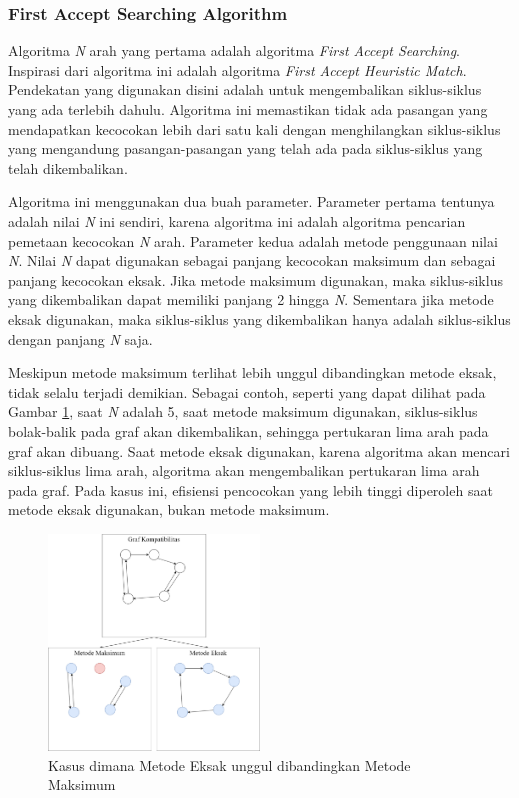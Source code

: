 \documentclass[conference]{IEEEtran}
\begin{document}
\subsubsection{First Accept Searching Algorithm}
Algoritma \textit{N} arah yang pertama adalah algoritma \textit{First Accept Searching}. Inspirasi dari algoritma ini adalah
algoritma \textit{First Accept Heuristic Match}. Pendekatan yang digunakan disini adalah untuk mengembalikan siklus-siklus
yang ada terlebih dahulu. Algoritma ini memastikan tidak ada pasangan yang mendapatkan kecocokan lebih dari satu kali dengan
menghilangkan siklus-siklus yang mengandung pasangan-pasangan yang telah ada pada siklus-siklus yang telah dikembalikan.

Algoritma ini menggunakan dua buah parameter. Parameter pertama tentunya adalah nilai \textit{N} ini sendiri, karena
algoritma ini adalah algoritma pencarian pemetaan kecocokan \textit{N} arah. Parameter kedua adalah metode penggunaan
nilai \textit{N}. Nilai \textit{N} dapat digunakan sebagai panjang kecocokan maksimum dan sebagai panjang kecocokan eksak.
Jika metode maksimum digunakan, maka siklus-siklus yang dikembalikan dapat memiliki panjang 2 hingga \textit{N}. Sementara
jika metode eksak digunakan, maka siklus-siklus yang dikembalikan hanya adalah siklus-siklus dengan panjang \textit{N} saja.

Meskipun metode maksimum terlihat lebih unggul dibandingkan metode eksak, tidak selalu terjadi demikian. Sebagai contoh, seperti
yang dapat dilihat pada Gambar \ref{maxvsexact}, saat \textit{N} adalah 5, saat metode maksimum digunakan, siklus-siklus bolak-balik
pada graf akan dikembalikan, sehingga pertukaran lima arah pada graf akan dibuang. Saat metode eksak digunakan, karena algoritma
akan mencari siklus-siklus lima arah, algoritma akan mengembalikan pertukaran lima arah pada graf. Pada kasus ini, efisiensi pencocokan
yang lebih tinggi diperoleh saat metode eksak digunakan, bukan metode maksimum.

\begin{figure}[h]
    \includegraphics[width=0.5\textwidth]{images/maksimum-vs-eksak.png}
    \caption{Kasus dimana Metode Eksak unggul dibandingkan Metode Maksimum}
    \label{maxvsexact}
\end{figure}
\end{document}
